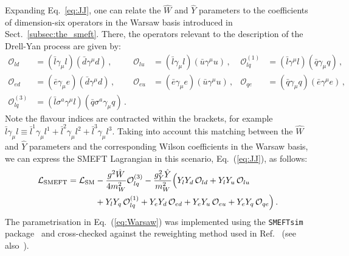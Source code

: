 \documentclass[withindex,glossary]{cam-thesis}
\begin{document}
Expanding Eq.~\eqref{eq:JJ}, one can relate the $\hat{W}$ and $\hat{Y}$ parameters
to the coefficients of dimension-six operators in the Warsaw basis introduced in Sect.~\ref{subsec:the_smeft}.
%
There, the operators  relevant to the description of the Drell-Yan process are given by:
\begin{equation}
\begin{aligned}\label{eq:Warsaw}
\mathcal{O}_{ld} &= (\bar  l\gamma_\mu l)(\bar d \gamma^\mu d) \,, 
&
\mathcal{O}_{lu} &= (\bar  l\gamma_\mu l)(\bar u \gamma^\mu u) \,,
&
\mathcal{O}_{lq}^{(1)} &= (\bar l \gamma^\mu l) (\bar  q\gamma_\mu q)\,,   
\\
\mathcal{O}_{ed} &= (\bar  e\gamma_\mu e)(\bar d \gamma^\mu d) \,, 
&
\mathcal{O}_{eu} &= (\bar  e\gamma_\mu e)(\bar u \gamma^\mu u) \,,
&
\mathcal{O}_{qe} &=  (\bar  q\gamma_\mu q) (\bar e \gamma^\mu e)\,,
\\
\mathcal{O}_{lq}^{(3)} &=(\bar l \sigma^a \gamma^\mu l)  (\bar  q \sigma^a \gamma_\mu q) \, .
\end{aligned}
\end{equation}
Note the flavour indices are contracted within the brackets, for example $\bar  l\gamma_\mu l \equiv \bar  l^1 \gamma_\mu l^1 + \bar  l^2 \gamma_\mu l^2 + \bar  l^3 \gamma_\mu l^3$. 
%
Taking into account this matching between the $\hat{W}$ and $\hat{Y}$ parameters
and the corresponding Wilson coefficients
in the Warsaw basis,
we can express the SMEFT Lagrangian in this scenario, Eq.~(\ref{eq:JJ}), as follows:
\begin{align}\label{eq:WYWarsaw}
\mathcal{L}_{\rm SMEFT}=\mathcal{L}_{\rm SM}   &-\frac{g^2 \hat{W}}{4
                                                 m_W^2}
                                                 \mathcal{O}_{lq}^{(3)}
                                                 - \frac{ g_Y^2
                                                 \hat{Y} }{m_W^2}
                                                 \Big(Y_l Y_d \,
                                                 \mathcal{O}_{ld} +
                                                 Y_l Y_u \,
                                                 \mathcal{O}_{lu}
                                                 \nonumber \\&+Y_l Y_q
  \, \mathcal{O}_{lq}^{(1)} + Y_e Y_d \, \mathcal{O}_{ed} + Y_e Y_u \,
  \mathcal{O}_{eu} + Y_e Y_q \, \mathcal{O}_{q e} \Big) \,.
\end{align}
The parametrisation in Eq.~(\ref{eq:Warsaw}) was implemented using the {\tt SMEFTsim} package~\cite{Brivio:2017btx} and cross-checked against the reweighting method used in Ref.~\cite{Greljo:2017vvb} (see also~\cite{Ricci:2020xre}).
\end{document}
